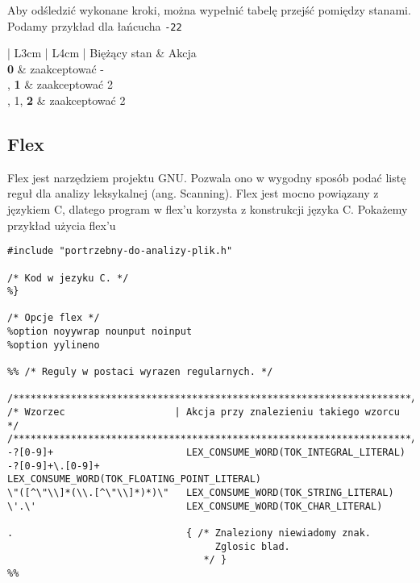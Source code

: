 \documentclass[leqno, 12pt]{article}
\newcommand{\spacing}{\vskip 0.5cm}
\begin{document}
			Aby odśledzić wykonane kroki, można wypełnić tabelę przejść pomiędzy stanami. Podamy przykład dla
			łańcucha \texttt{-22}

			\spacing
			\spacing

		\begin{center}
			\setlength{\tabcolsep}{0.5em}
			\renewcommand{\arraystretch}{1.2}
			\begin{tabular}{ | L{3cm} | L{4cm} | }
				\hline
				Biężący stan        & Akcja \\
				\hline
				\textbf{0}          & zaakceptować - \\
				, \textbf{1}       & zaakceptować 2 \\
				, 1, \textbf{2}    & zaakceptować 2 \\
				\hline
			\end{tabular}
		\end{center}
		
		\newpage

	\subsection{Flex}

		Flex jest narzędziem projektu GNU. Pozwala ono w wygodny sposób podać listę reguł dla analizy
		leksykalnej (ang. Scanning). Flex jest mocno powiązany z językiem C, dlatego program w flex'u
		korzysta z konstrukcji języka C. Pokażemy przykład użycia flex'u
		
		\spacing
		
		\begin{lstlisting}[caption={Przykład użycia flex}, label={lst:flex-example}]
%{
#include "portrzebny-do-analizy-plik.h"

/* Kod w jezyku C. */
%}

/* Opcje flex */
%option noyywrap nounput noinput
%option yylineno

%% /* Reguly w postaci wyrazen regularnych. */

/*********************************************************************/
/* Wzorzec                   | Akcja przy znalezieniu takiego wzorcu */
/*********************************************************************/
-?[0-9]+                       LEX_CONSUME_WORD(TOK_INTEGRAL_LITERAL)
-?[0-9]+\.[0-9]+               LEX_CONSUME_WORD(TOK_FLOATING_POINT_LITERAL)
\"([^\"\\]*(\\.[^\"\\]*)*)\"   LEX_CONSUME_WORD(TOK_STRING_LITERAL)
\'.\'                          LEX_CONSUME_WORD(TOK_CHAR_LITERAL)

.                              { /* Znaleziony niewiadomy znak.
                                    Zglosic blad.
                                  */ }
%%
		\end{lstlisting}
\end{document}
